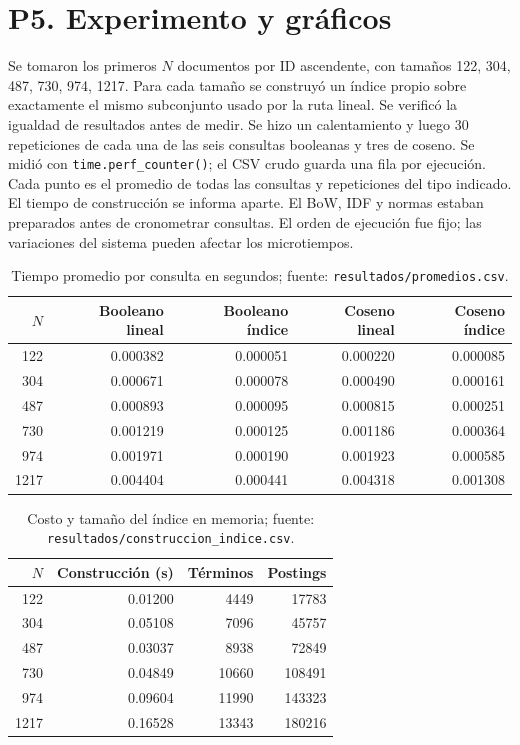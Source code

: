 \documentclass[11pt,a4paper]{article}
\newcommand{\codigo}[1]{\texttt{#1}}
\begin{document}
\section{P5. Experimento y gráficos}
Se tomaron los primeros $N$ documentos por ID ascendente, con tamaños
122, 304, 487, 730, 974, 1217. Para cada tamaño se construyó un índice propio sobre exactamente el
mismo subconjunto usado por la ruta lineal. Se verificó la igualdad de resultados
antes de medir. Se hizo un calentamiento y luego 30 repeticiones de cada
una de las seis consultas booleanas y tres de coseno. Se midió con
\codigo{time.perf\_counter()}; el CSV crudo guarda una fila por ejecución.
Cada punto es el promedio de todas las consultas y repeticiones del tipo indicado.
El tiempo de construcción se informa aparte. El BoW, IDF y normas estaban
preparados antes de cronometrar consultas. El orden de ejecución fue fijo;
las variaciones del sistema pueden afectar los microtiempos.
\begin{table}[H]\centering\small
\begin{tabular}{rrrrr}\toprule
$N$ & Booleano lineal & Booleano índice & Coseno lineal & Coseno índice\\\midrule
122 & 0.000382 & 0.000051 & 0.000220 & 0.000085 \\
304 & 0.000671 & 0.000078 & 0.000490 & 0.000161 \\
487 & 0.000893 & 0.000095 & 0.000815 & 0.000251 \\
730 & 0.001219 & 0.000125 & 0.001186 & 0.000364 \\
974 & 0.001971 & 0.000190 & 0.001923 & 0.000585 \\
1217 & 0.004404 & 0.000441 & 0.004318 & 0.001308 \\
\bottomrule\end{tabular}
\caption{Tiempo promedio por consulta en segundos; fuente: \codigo{resultados/promedios.csv}.}
\end{table}
\begin{table}[H]\centering\small
\begin{tabular}{rrrr}\toprule
$N$ & Construcción (s) & Términos & Postings\\\midrule
122 & 0.01200 & 4449 & 17783 \\
304 & 0.05108 & 7096 & 45757 \\
487 & 0.03037 & 8938 & 72849 \\
730 & 0.04849 & 10660 & 108491 \\
974 & 0.09604 & 11990 & 143323 \\
1217 & 0.16528 & 13343 & 180216 \\
\bottomrule\end{tabular}
\caption{Costo y tamaño del índice en memoria; fuente: \codigo{resultados/construccion\_indice.csv}.}
\end{table}
\end{document}
